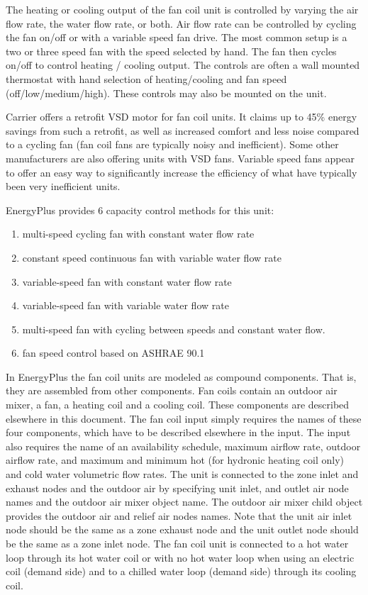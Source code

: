 The heating or cooling output of the fan coil unit is controlled by varying the air flow rate, the water flow rate, or both. Air flow rate can be controlled by cycling the fan on/off or with a variable speed fan drive. The most common setup is a two or three speed fan with the speed selected by hand. The fan then cycles on/off to control heating / cooling output. The controls are often a wall mounted thermostat with hand selection of heating/cooling and fan speed (off/low/medium/high). These controls may also be mounted on the unit.

Carrier offers a retrofit VSD motor for fan coil units. It claims up to 45\% energy savings from such a retrofit, as well as increased comfort and less noise compared to a cycling fan (fan coil fans are typically noisy and inefficient). Some other manufacturers are also offering units with VSD fans. Variable speed fans appear to offer an easy way to significantly increase the efficiency of what have typically been very inefficient units.

EnergyPlus provides 6 capacity control methods for this unit:

\begin{enumerate}
\def\labelenumi{\arabic{enumi}.}
\item
  multi-speed cycling fan with constant water flow rate
\item
  constant speed continuous fan with variable water flow rate
\item
  variable-speed fan with constant water flow rate
\item
  variable-speed fan with variable water flow rate
\item
  multi-speed fan with cycling between speeds and constant water flow.
\item
  fan speed control based on ASHRAE 90.1
\end{enumerate}

In EnergyPlus the fan coil units are modeled as compound components. That is, they are assembled from other components. Fan coils contain an outdoor air mixer, a fan, a heating coil and a cooling coil. These components are described elsewhere in this document. The fan coil input simply requires the names of these four components, which have to be described elsewhere in the input. The input also requires the name of an availability schedule, maximum airflow rate, outdoor airflow rate, and maximum and minimum hot (for hydronic heating coil only) and cold water volumetric flow rates. The unit is connected to the zone inlet and exhaust nodes and the outdoor air by specifying unit inlet, and outlet air node names and the outdoor air mixer object name. The outdoor air mixer child object provides the outdoor air and relief air nodes names. Note that the unit air inlet node should be the same as a zone exhaust node and the unit outlet node should be the same as a zone inlet node. The fan coil unit is connected to a hot water loop through its hot water coil or with no hot water loop when using an electric coil (demand side) and to a chilled water loop (demand side) through its cooling coil.

